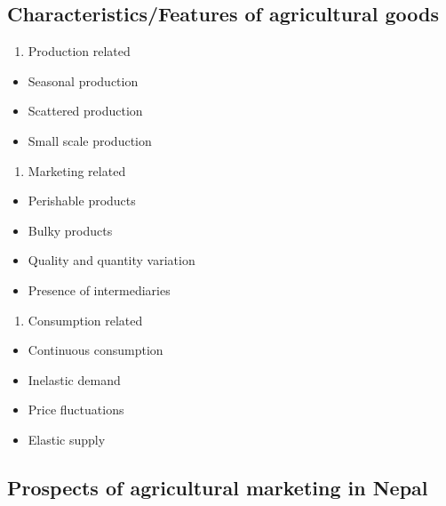 \documentclass[11pt,]{book}
\providecommand{\tightlist}{%
  \setlength{\itemsep}{0pt}\setlength{\parskip}{0pt}}
\theoremstyle{definition}
\theoremstyle{definition}
\theoremstyle{definition}
\theoremstyle{remark}
\begin{document}
\subsection{Characteristics/Features of agricultural
goods}\label{characteristicsfeatures-of-agricultural-goods}

\begin{enumerate}
\def\labelenumi{\arabic{enumi}.}
\tightlist
\item
  Production related
\end{enumerate}

\begin{itemize}
\tightlist
\item
  Seasonal production
\item
  Scattered production
\item
  Small scale production
\end{itemize}

\begin{enumerate}
\def\labelenumi{\arabic{enumi}.}
\setcounter{enumi}{1}
\tightlist
\item
  Marketing related
\end{enumerate}

\begin{itemize}
\tightlist
\item
  Perishable products
\item
  Bulky products
\item
  Quality and quantity variation
\item
  Presence of intermediaries
\end{itemize}

\begin{enumerate}
\def\labelenumi{\arabic{enumi}.}
\setcounter{enumi}{2}
\tightlist
\item
  Consumption related
\end{enumerate}

\begin{itemize}
\tightlist
\item
  Continuous consumption
\item
  Inelastic demand
\item
  Price fluctuations
\item
  Elastic supply
\end{itemize}

\subsection{Prospects of agricultural marketing in
Nepal}\label{prospects-of-agricultural-marketing-in-nepal}
\end{document}

